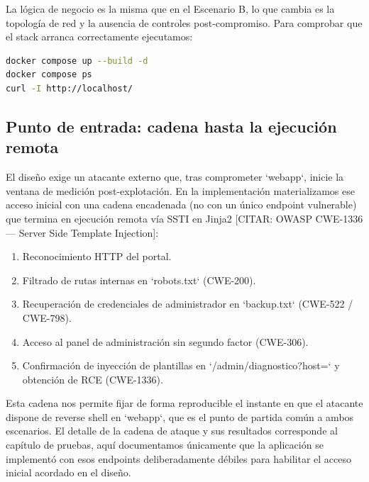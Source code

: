 \documentclass[11pt,spanish,listoffigures,listoftables]{tfgetsinf}
\begin{document}
        La lógica de negocio es la misma que en el Escenario B, lo que cambia es la topología de red y la ausencia de controles post-compromiso. Para comprobar que el stack arranca correctamente ejecutamos:
        
        \begin{lstlisting}[language=Bash, aboveskip=10pt, belowskip=0pt]
docker compose up --build -d
docker compose ps
curl -I http://localhost/
        \end{lstlisting}
        
        \subsection{Punto de entrada: cadena hasta la ejecución remota}     %
        El diseño exige un atacante externo que, tras comprometer `webapp`, inicie la ventana de medición post-explotación. En la implementación materializamos ese acceso inicial con una cadena encadenada (no con un único endpoint vulnerable) que termina en ejecución remota vía SSTI en Jinja2 [CITAR: OWASP CWE-1336 — Server Side Template Injection]:
        \begin{enumerate}
            \item Reconocimiento HTTP del portal.
            \item Filtrado de rutas internas en `robots.txt` (CWE-200).
            \item Recuperación de credenciales de administrador en `backup.txt` (CWE-522 / CWE-798).
            \item Acceso al panel de administración sin segundo factor (CWE-306).
            \item Confirmación de inyección de plantillas en `/admin/diagnostico?host=` y obtención de RCE (CWE-1336).
        \end{enumerate}
        
        Esta cadena nos permite fijar de forma reproducible el instante en que el atacante dispone de reverse shell en `webapp`, que es el punto de partida común a ambos escenarios. El detalle de la cadena de ataque y sus resultados corresponde al capítulo de pruebas, aquí documentamos únicamente que la aplicación se implementó con esos endpoints deliberadamente débiles para habilitar el acceso inicial acordado en el diseño.
        
\end{document}
